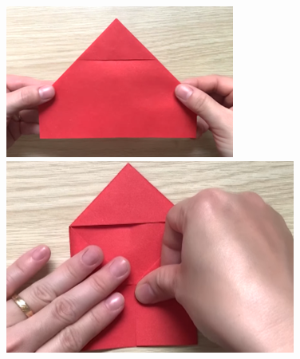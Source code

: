 \begin{multicols}{2}
	\begin{figure}[H]
			\vspace*{-5pt}
			\centering
			\captionsetup{labelformat= empty, justification=centering}
			\includegraphics[height= 0.327\linewidth]{26}
			\includegraphics[height= 0.327\linewidth]{27}
			

\end{figure}
\end{multicols}
